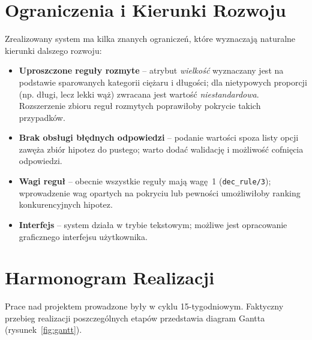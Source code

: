 \documentclass[11pt,a4paper]{article}
\newcommand{\code}[1]{\texttt{#1}}
\begin{document}
\section{Ograniczenia i Kierunki Rozwoju}
Zrealizowany system ma kilka znanych ograniczeń, które wyznaczają naturalne
kierunki dalszego rozwoju:
\begin{itemize}[noitemsep]
    \item \textbf{Uproszczone reguły rozmyte} -- atrybut \textit{wielkość}
          wyznaczany jest na podstawie sparowanych kategorii ciężaru i długości;
          dla nietypowych proporcji (np. długi, lecz lekki wąż) zwracana jest
          wartość \textit{niestandardowa}. Rozszerzenie zbioru reguł rozmytych
          poprawiłoby pokrycie takich przypadków.
    \item \textbf{Brak obsługi błędnych odpowiedzi} -- podanie wartości spoza
          listy opcji zawęża zbiór hipotez do pustego; warto dodać walidację
          i możliwość cofnięcia odpowiedzi.
    \item \textbf{Wagi reguł} -- obecnie wszystkie reguły mają wagę~1
          (\code{dec\_rule/3}); wprowadzenie wag opartych na pokryciu lub
          pewności umożliwiłoby ranking konkurencyjnych hipotez.
    \item \textbf{Interfejs} -- system działa w trybie tekstowym; możliwe jest
          opracowanie graficznego interfejsu użytkownika.
\end{itemize}

\section{Harmonogram Realizacji}
Prace nad projektem prowadzone były w cyklu 15-tygodniowym. Faktyczny przebieg
realizacji poszczególnych etapów przedstawia diagram Gantta
(rysunek~\ref{fig:gantt}).
\end{document}

